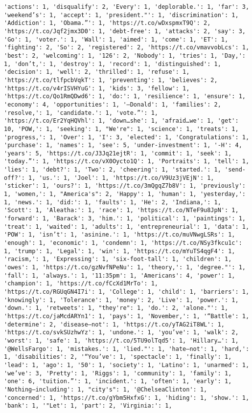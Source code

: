 \documentclass[11pt]{article}
\begin{document}
\begin{Verbatim}[commandchars=\\\{\}]
'actions': 1, 'disqualify': 2, 'Every': 1, 'deplorable.': 1, 'far': 3, 'weekend’s': 1, 'accept': 1, 'president."': 1, 'discrimination': 1, 'Addiction': 1, 'Obama.”': 1, 'https://t.co/wDxspmxT9Q': 2, 'https://t.co/Jqf2jmx3D0': 1, 'debt-free': 1, 'attacks': 2, 'say': 3, 'Go': 1, 'voter.': 1, 'Wall': 1, 'aimed': 1, 'come': 1, 'ET': 1, 'fighting': 2, 'So': 2, 'registered': 2, 'https://t.co/vmavvobLcs': 1, 'best': 2, 'welcoming': 1, '126': 2, 'Nobody': 1, 'tries': 1, 'Day,': 1, 'don’t,': 1, 'destroy': 1, 'record': 1, 'distinguished': 1, 'decision': 1, 'well': 2, 'thrilled': 1, 'refuse': 1, 'https://t.co/tlfpcbVqkT': 1, 'preventing': 1, 'believes': 2, 'https://t.co/v4rISVHYuG': 1, 'kids': 3, 'fellow': 1, 'https://t.co/Qo1RmQDwd6': 1, 'do:': 1, 'resilience': 1, 'ensure': 1, 'economy': 4, 'opportunities': 1, '—Donald': 1, 'families': 2, 'resolve,': 1, 'candidate.': 1, 'vote.”': 1, 'https://t.co/Er2YqHQVhl': 1, 'down…she': 1, 'afraid…we': 1, 'get': 10, 'POW,': 1, 'seeking': 1, "We're": 1, 'science': 1, 'treats': 1, 'progress,': 1, 'Over': 1, 'I': 3, 'elected': 1, 'Congratulations': 1, 'purchase': 1, 'names': 1, 'see': 5, 'under-investment': 1, '-H': 4, 'years': 5, 'https://t.co/J3Jq21ejtR': 1, 'commit': 1, 'seek': 1, 'today.”': 1, 'https://t.co/vX0Oycto1Q': 1, 'Portraits': 1, 'tell': 1, 'lies': 1, 'debt?': 1, 'Two': 2, 'cheering': 1, 'started.': 1, 'send-off?': 1, 'us.': 1, 'Joel': 1, 'https://t.co/V9Uz3jVEjN': 1, 'sticker': 1, 'ours?': 1, 'https://t.co/3mQgqZ7b8V': 1, 'previously': 1, 'women,': 1, "America's": 2, 'Happy': 1, 'human': 1, 'yesterday,': 1, 'news.': 1, 'did:': 1, 'faults': 1, 'He': 2, 'Indiana,': 1, 'Scott': 1, 'Aleatha:': 1, 'race': 1, 'https://t.co/NTeF9u8JpN': 1, 'forward': 1, 'Barack': 3, 'him.': 1, 'political': 1, 'paintings': 1, 'treat': 1, 'waited': 1, 'adults': 1, 'entrepreneurial': 1, 'data': 1, 'POW': 1, 'isn’t': 1, 'asinine.': 1, 'https://t.co/muVNwgLSRs': 1, 'enough': 1, 'economic': 1, 'condemn': 1, 'https://t.co/NSy3fkcu1c': 1, 'trump': 1, 'Legal': 1, 'win': 1, 'https://t.co/mYuTS4qgF4': 1, 'racism,': 1, 'Expressing': 1, 'six-foot-tall': 1, 'children': 1, 'owes': 1, 'https://t.co/gzNvfNPeNu': 1, 'theory,': 1, 'degree."': 1, 'fall': 1, 'always.': 1, '11:35pm': 1, 'Americans': 4, 'power': 1, 'champion': 1, 'https://t.co/fCcXd1MrTo': 1, 'https://t.co/RGUqGN4I7i': 1, 'College': 1, 'child': 1, 'barriers': 1, 'knowingly': 1, 'Tolerance': 1, 'money': 2, 'Live': 1, 'power.': 1, 'down.': 1, 'retweets': 1, "they're": 1, 'do.': 2, 'alone."': 1, 'https://t.co/jaMcdARYn1': 1, 'pays': 1, 'November,': 1, '“Battle': 1, 'determine': 2, 'disease—not': 1, 'https://t.co/yTAG2iT8WL': 1, 'https://t.co/svkSUzhwYz': 1, 'undone.': 1, 'you’ve': 1, 'walk': 2, 'worst': 1, 'safe': 1, 'https://t.co/5TU9olTqd5': 1, 'Hillary…': 1, '@WellsFargo': 1, 'mistakes.': 1, 'lied."': 1, 'hate—not': 1, 'hard,': 1, 'disabilities': 2, '“You’ve': 1, 'spectacle': 1, 'finally': 1, 'lead': 1, 'ago': 1, '50': 1, 'society': 1, 'Latino': 1, 'unarmed': 1, 'we’ve': 3, 'Pretty': 1, 'Riggs': 1, 'community': 1, 'family': 1, 'one': 6, 'tuition.”': 1, 'incident.': 1, 'often': 1, 'early': 1, 'Nothing—including': 1, "city's": 1, '@ChelseaClinton': 1, 'concerned': 1, 'https://t.co/gYbm5HxfxG': 1, 'hiding': 1, 'show.': 1, 'bank': 1, '"Let': 1, 'part': 2, 'Virginia:': 1, 
\end{Verbatim}
\end{document}
